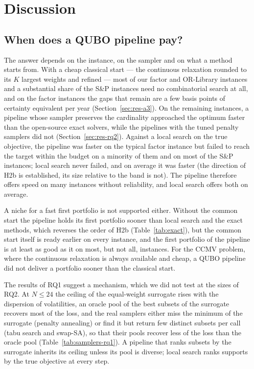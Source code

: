\section{Discussion}\label{sec:discussion}

\subsection{When does a QUBO pipeline pay?}\label{sec:disc-when}

The answer depends on the instance, on the sampler and on what a method starts from. With a cheap classical start ---
the continuous relaxation rounded to its $K$ largest weights and refined --- most of our factor and OR-Library
instances and a substantial share of the S\&P instances need no combinatorial search at all, and on the factor
instances the gaps that remain are a few basis points of certainty equivalent per year (Section~\ref{sec:res-a3}).
On the remaining instances, a pipeline whose sampler preserves the cardinality approached the optimum faster than the
open-source exact solvers, while the pipelines with the tuned penalty samplers did not (Section~\ref{sec:res-rq2}).
Against a local search on the true objective, the pipeline was faster on the typical factor instance but failed to
reach the target within the budget on a minority of them and on most of the S\&P instances; local search never
failed, and on average it was faster (the direction of H2b is established, its size relative to the band is not).
The pipeline therefore offers speed on many instances without reliability, and local search offers both on average.

A niche for a fast first portfolio is not supported either. Without the common start the pipeline holds its first
portfolio sooner than local search and the exact methods, which reverses the order of H2b (Table~\ref{tab:exact}), but
the common start itself is ready earlier on every instance, and the first portfolio of the pipeline is at least as
good as it on most, but not all, instances. For the CCMV problem, where the continuous relaxation is always available and cheap, a QUBO pipeline
did not deliver a portfolio sooner than the classical start.

The results of RQ1 suggest a mechanism, which we did not test at the sizes of RQ2. At $N \le 24$ the ceiling of the
equal-weight surrogate rises with the dispersion of volatilities, an oracle pool of the best subsets of the surrogate
recovers most of the loss, and the real samplers either miss the minimum of the surrogate (penalty annealing) or
find it but return few distinct subsets per call (tabu search and swap-SA), so that their pools recover less of the
loss than the oracle pool (Table~\ref{tab:samplers-rq1}). A pipeline that ranks subsets by the surrogate inherits its
ceiling unless its pool is diverse; local search ranks supports by the true objective at every step.

